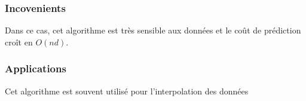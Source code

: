 \documentclass{article}
\begin{document}
\subsubsection{Incovenients}
Dans ce cas, cet algorithme est très sensible aux données et le coût de prédiction croît en $O(nd)$.  
\subsubsection{Applications}
Cet algorithme est souvent utilisé pour l'interpolation des données





\end{document}
